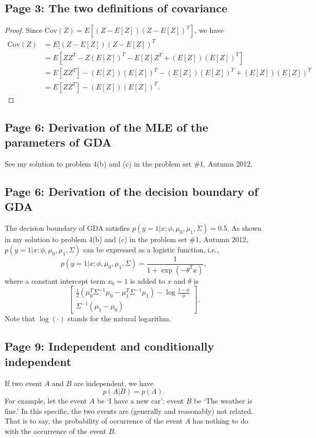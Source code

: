 \documentclass{article}
\begin{document}
\subsection{Page 3: The two definitions of covariance}
\begin{proof}
Since $\text{Cov}(Z)=E[(Z-E[Z])(Z-E[Z])^T]$, we have
\[
\begin{split}
\text{Cov}(Z)&=E[(Z-E[Z])(Z-E[Z])^T\\
&=E[ZZ^T-Z(E[Z])^T-E[Z]Z^T+(E[Z])(E[Z])^T]\\
&=E[ZZ^T]-(E[Z])(E[Z])^T-(E[Z])(E[Z])^T+(E[Z])(E[Z])^T\\
&=E[ZZ^T]-(E[Z])(E[Z])^T.
\end{split}
\]
\end{proof}

\subsection{Page 6: Derivation of the MLE of the parameters of GDA}
See my solution to problem 4(b) and (c) in the problem set \#1, Autumn 2012.

\subsection{Page 6: Derivation of the decision boundary of GDA}
The decision boundary of GDA satisfies $p(y=1|x;\phi,\mu_0,\mu_1,\Sigma)=0.5$. As shown in my solution to problem 4(b) and (c) in the problem set \#1, Autumn 2012, $p(y=1|x;\phi,\mu_0,\mu_1,\Sigma)$ can be expressed as a logistic function, i.e.,
\[
p(y=1|x;\phi,\mu_0,\mu_1,\Sigma)=\frac{1}{1+\exp{(-\theta^Tx)}},
\]
where a constant intercept term $x_0= 1$ is added to $x$ and $\theta$ is
\[
\left[\begin{array}{c}
\frac{1}{2}(\mu_0^T\Sigma^{-1}\mu_0-\mu_1^T\Sigma^{-1}\mu_1)-\log\frac{1-\phi}{\phi}\\
\Sigma^{-1}(\mu_1-\mu_0)
\end{array}\right].
\]
Note that $\log(\cdot)$ stands for the natural logarithm.

\subsection{Page 9: Independent and conditionally independent}
If two event $A$ and $B$ are independent, we have
\[
p(A|B)=p(A).
\]
For example, let the event $A$ be `I have a new car'; event $B$ be `The weather is fine.' In this specific, the two events are (generally and reasonably) not related. That is to say, the probability of occurrence of the event $A$ has nothing to do with the occurrence of the event $B$.
\end{document}
